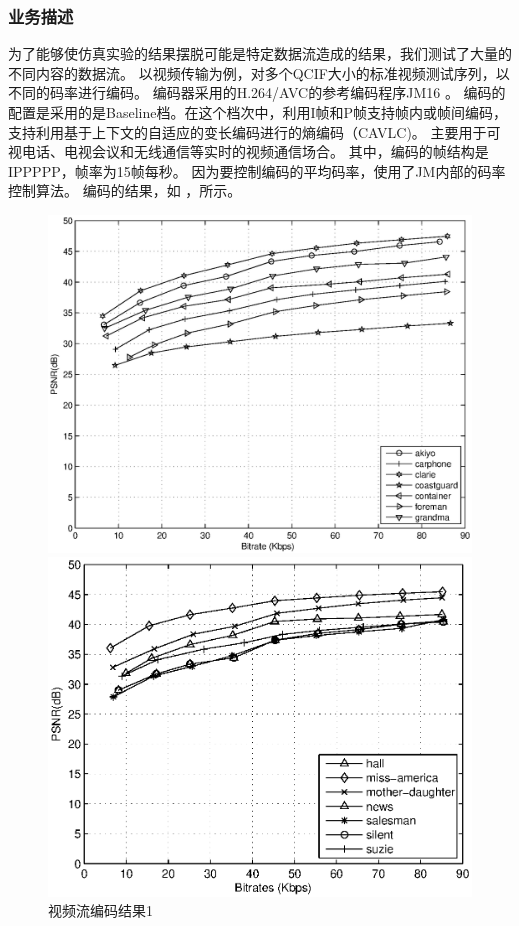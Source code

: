 \subsubsection{业务描述}
为了能够使仿真实验的结果摆脱可能是特定数据流造成的结果，我们测试了大量的不同内容的数据流。
以视频传输为例，对多个QCIF大小的标准视频测试序列，以不同的码率进行编码。
编码器采用的H.264/AVC的参考编码程序JM16 \cite{h_264_codec}。
编码的配置是采用的是Baseline档。在这个档次中，利用I帧和P帧支持帧内或帧间编码，
支持利用基于上下文的自适应的变长编码进行的熵编码（CAVLC)。
主要用于可视电话、电视会议和无线通信等实时的视频通信场合\cite{BiHouJie2009}。
其中，编码的帧结构是IPPPPP，帧率为15帧每秒。
因为要控制编码的平均码率，使用了JM内部的码率控制算法。
编码的结果，如 ，所示。
\begin{figure}[tb] 
  \begin{minipage}[t]{0.5\linewidth} 
    \centering 
    \includegraphics[width = \textwidth]{chap_nash_videobitrate_psnr1.eps} 
    \caption{视频流编码结果1} 
    \label{fig:chap_nash:video_psnr1} 
  \end{minipage}%
  \begin{minipage}[t]{0.5\linewidth} 
    \centering 
    \includegraphics[width=\textwidth]{chap_nash_videobitrate_psnr2.eps} 

\end{minipage}
\end{figure}
